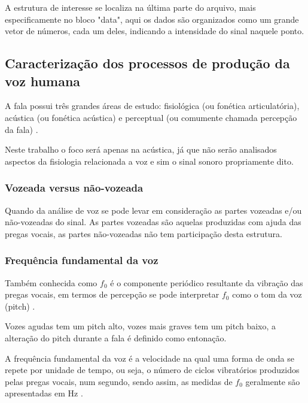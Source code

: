 			\par A estrutura de interesse se localiza na última parte do arquivo, mais especificamente no bloco "data", aqui os dados são organizados como um grande vetor de números, cada um deles, indicando a intensidade do sinal naquele ponto.
		\subsection{Caracterização dos processos de produção da voz humana}
			\par A fala possui três grandes áreas de estudo: fisiológica (ou fonética articulatória),  acústica  (ou fonética acústica)  e  perceptual  (ou  comumente  chamada percepção  da  fala) \cite{kremer2014eficiencia}.
			\par Neste trabalho o foco será apenas na acústica, já que não serão analisados aspectos da fisiologia relacionada a voz e sim o sinal sonoro propriamente dito.
			
			\subsubsection{Vozeada versus não-vozeada}

			\par Quando da análise de voz se pode levar em consideração as partes vozeadas e/ou não-vozeadas do sinal. As partes vozeadas são aquelas produzidas com ajuda das pregas vocais, as partes não-vozeadas não tem participação desta estrutura.
			
			\subsubsection{Frequência fundamental da voz}
				\par Também conhecida como $f_0$ é o componente periódico resultante da vibração das pregas vocais, em termos de percepção se pode interpretar $f_0$ como o tom da voz (pitch) \cite{kremer2014eficiencia}.
			
				\par Vozes agudas tem um pitch alto, vozes mais graves tem um pitch baixo, a alteração do pitch durante a fala é definido como entonação.
				
				\par A frequência fundamental da voz é a velocidade na qual uma forma de onda se repete
				por unidade de tempo, ou seja, o número de ciclos vibratórios produzidos pelas pregas vocais, num segundo, sendo assim, as medidas de $f_0$ geralmente são apresentadas em Hz \cite{freitas2013avaliaccao}.
			
